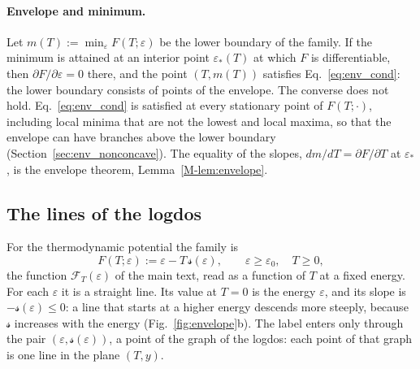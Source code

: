 \documentclass[10pt,a4paper]{article}
\theoremstyle{plain}
\theoremstyle{remark}
\newcommand{\lndos}{{logdos}}  %
\newcommand{\Fen}[1][T]{\mathscr{F}_{#1}}  %
\newcommand{\lds}{\mathscr{s}}  %
\begin{document}
\paragraph{Envelope and minimum.} Let
$m(T):=\min_\varepsilon F(T;\varepsilon)$ be the lower boundary of the
family. If the minimum is attained at an interior point $\varepsilon_*(T)$
at which $F$ is differentiable, then $\partial F/\partial\varepsilon=0$
there, and the point $(T,m(T))$ satisfies Eq.~\eqref{eq:env_cond}: the lower
boundary consists of points of the envelope. The converse does not hold.
Eq.~\eqref{eq:env_cond} is satisfied at every stationary point of
$F(T;\cdot)$, including local minima that are not the lowest and local
maxima, so that the envelope can have branches above the lower boundary
(Section~\ref{sec:env_nonconcave}). The equality of the slopes,
$dm/dT=\partial F/\partial T$ at $\varepsilon_*$, is the envelope theorem,
Lemma~\ref{M-lem:envelope}.

\subsection{The lines of the \lndos{}}
\label{sec:env_lines}

For the thermodynamic potential the family is
\begin{equation}\label{eq:env_family}
  F(T;\varepsilon):=\varepsilon-T\,\lds(\varepsilon) ,
  \qquad \varepsilon\ge\varepsilon_0 ,\quad T\ge0 ,
\end{equation}
the function $\Fen(\varepsilon)$ of the main text, read as a function of
$T$ at a fixed energy. For each $\varepsilon$ it is a straight line. Its
value at $T=0$ is the energy $\varepsilon$, and its slope is
$-\lds(\varepsilon)\le0$: a line that starts at a higher energy descends
more steeply, because $\lds$ increases with the energy
(Fig.~\ref{fig:envelope}b). The label enters only through the pair
$(\varepsilon,\lds(\varepsilon))$, a point of the graph of the \lndos{}:
each point of that graph is one line in the plane $(T,y)$.
\end{document}
